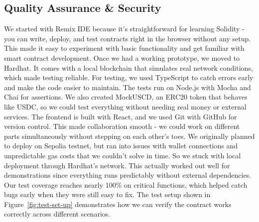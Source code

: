 \documentclass[11pt,a4paper]{article}
\begin{document}
    \subsection{Quality Assurance \& Security}\label{subsec:qa-security}
   We started with Remix IDE because it's straightforward for learning Solidity - you can write, deploy, and test contracts right in the browser without any setup. This made it easy to experiment with basic functionality and get familiar with smart contract development.
Once we had a working prototype, we moved to Hardhat. It comes with a local blockchain that simulates real network conditions, which made testing reliable.
For testing, we used TypeScript to catch errors early and make the code easier to maintain. The tests run on Node.js with Mocha and Chai for assertions. We also created MockUSCD, an ERC20 token that behaves like USDC, so we could test everything without needing real money or external services.
The frontend is built with React, and we used Git with GitHub for version control. This made collaboration smooth - we could work on different parts simultaneously without stepping on each other's toes.
We originally planned to deploy on Sepolia testnet, but ran into issues with wallet connections and unpredictable gas costs that we couldn't solve in time. So we stuck with local deployment through Hardhat's network. This actually worked out well for demonstrations since everything runs predictably without external dependencies.
Our test coverage reaches nearly 100\% on critical functions, which helped catch bugs early when they were still easy to fix. The test setup shown in Figure~\ref{fig:test-set-up} demonstrates how we can verify the contract works correctly across different scenarios.
\end{document}
